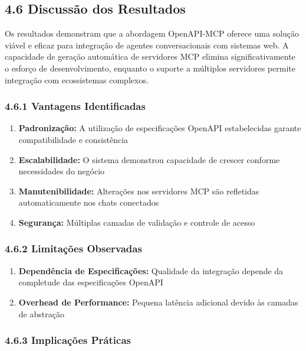 \documentclass[
]{article}
\providecommand{\tightlist}{%
  \setlength{\itemsep}{0pt}\setlength{\parskip}{0pt}}
\begin{document}
\subsection{4.6 Discussão dos
Resultados}\label{discussuxe3o-dos-resultados}

Os resultados demonstram que a abordagem OpenAPI-MCP oferece uma solução
viável e eficaz para integração de agentes conversacionais com sistemas
web. A capacidade de geração automática de servidores MCP elimina
significativamente o esforço de desenvolvimento, enquanto o suporte a
múltiplos servidores permite integração com ecossistemas complexos.

\subsubsection{4.6.1 Vantagens
Identificadas}\label{vantagens-identificadas}

\begin{enumerate}
\def\labelenumi{\arabic{enumi}.}
\tightlist
\item
  \textbf{Padronização:} A utilização de especificações OpenAPI
  estabelecidas garante compatibilidade e consistência
\item
  \textbf{Escalabilidade:} O sistema demonstrou capacidade de crescer
  conforme necessidades do negócio
\item
  \textbf{Manutenibilidade:} Alterações nos servidores MCP são
  refletidas automaticamente nos chats conectados
\item
  \textbf{Segurança:} Múltiplas camadas de validação e controle de
  acesso
\end{enumerate}

\subsubsection{4.6.2 Limitações
Observadas}\label{limitauxe7uxf5es-observadas}

\begin{enumerate}
\def\labelenumi{\arabic{enumi}.}
\tightlist
\item
  \textbf{Dependência de Especificações:} Qualidade da integração
  depende da completude das especificações OpenAPI
\item
  \textbf{Overhead de Performance:} Pequena latência adicional devido às
  camadas de abstração
\end{enumerate}

\subsubsection{4.6.3 Implicações
Práticas}\label{implicauxe7uxf5es-pruxe1ticas}
\end{document}
